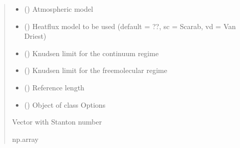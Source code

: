 \documentclass[letterpaper,10pt,english]{sphinxmanual}
\begin{document}
\begin{fulllineitems}
\begin{quote}
\begin{description}
\begin{itemize}
\item {} 
\sphinxAtStartPar
{} () \textendash{} Atmospheric model

\item {} 
\sphinxAtStartPar
{} () \textendash{} Heatflux model to be used (default = ??, sc = Scarab, vd = Van Driest)

\item {} 
\sphinxAtStartPar
{} () \textendash{} Knudsen limit for the continuum regime

\item {} 
\sphinxAtStartPar
{} () \textendash{} Knudsen limit for the free\sphinxhyphen{}molecular regime

\item {} 
\sphinxAtStartPar
{} () \textendash{} Reference length

\item {} 
\sphinxAtStartPar
{} ({\hyperref[\detokenize{modules:configuration.Options}]{}}) \textendash{} Object of class Options

\end{itemize}

\sphinxAtStartPar
{} \textendash{} Vector with Stanton number

\sphinxAtStartPar
np.array

\end{description}\end{quote}

\end{fulllineitems}

\end{document}
